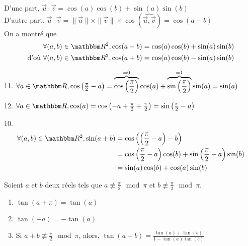 \begin{prv}
\begin{enumerate}
\begin{minipage}{\linewidth}
\begin{wrapfigure}{r}{1cm}
\begin{asy}
					\end{asy}
				\end{wrapfigure}
				D'une part, $\vec{u}\cdot \vec{v} = \cos(a)\cos(b) + \sin(a)\sin(b)$ \\
				D'autre part, $\vec{u} \cdot \vec{v} = \|\vec{u}\|\times \|\vec{v}\| \times \cos(\widehat{\vec{u}, \vec{v}}) = \cos(a-b)$ \\
				On a montré que
				\begin{align*}
					&\forall (a,b) \in \R^2, \cos(a-b) = \cos(a)\cos(b) + \sin(a)\sin(b)\\
					\text{d'où }& \forall (a,b) \in \R^2, \cos(a+b) = \cos(a)\cos(b) - \sin(a)\sin(b)
				\end{align*}
			\item[11.] $\forall a \in \R, \cos\left( \frac{\pi}{2}-a \right) = \overbrace{\cos\left( \frac{\pi}{2} \right)}^{=0}\cos(a) + \overbrace{\sin\left( \frac{\pi}{2} \right)}^{=1}\sin(a) = \sin(a)$
			\item[12.] $\forall a \in \R, \cos(a) = \cos\left( -a + \frac{\pi}{2} + \frac{\pi}{2} \right) =  \sin\left( \frac{\pi}{2} - a \right)$
			\item[10.]
				\begin{align*}
					\forall (a,b) \in \R^2,
					\sin(a+b) &= \cos\left( \left( \frac{\pi}{2}-a \right) -b \right) \\
					&= \cos\left( \frac{\pi}{2}-a \right) \cos(b) + \sin\left( \frac{\pi}{2}-a \right) \sin(b) \\
					&= \sin(a)\cos(b) + \cos(a) \sin(b) \\
				\end{align*}
			\end{minipage}
	\end{enumerate}
\end{prv}

\begin{prop}
	Soient $a$ et $b$ deux réels tels que $a\not\equiv \frac{\pi}{2} \mod \pi$ et $b\not\equiv \frac{\pi}{2}\mod\pi$.
	\begin{enumerate}
		\item $\tan(a+\pi) = \tan(a)$
		\item $\tan(-a) = -\tan(a)$ 
		\item Si $a+b \not\equiv \frac{\pi}{2} \mod\pi$, alors, $\tan(a+b) = \frac{\tan(a) + \tan(b)}{1-\tan(a)\tan(b)}$
	\end{enumerate}
\end{prop}

